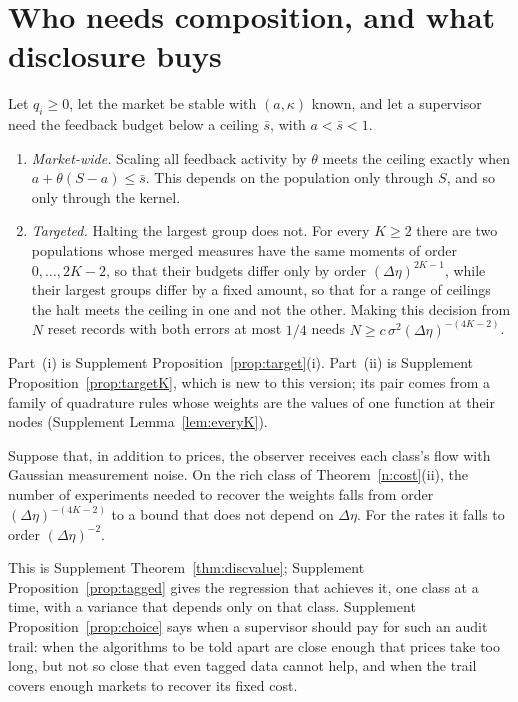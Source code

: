 \section{Who needs composition, and what disclosure buys}\label{n:sup}

\begin{proposition}\label{n:target}
Let $q_i\ge0$, let the market be stable with $(a,\kappa)$ known, and let a supervisor need the feedback budget below a ceiling $\bar s$, with $a<\bar s<1$.
\begin{enumerate}[label=(\roman*),itemsep=1pt]
\item \emph{Market-wide.} Scaling all feedback activity by $\theta$ meets the ceiling exactly when $a+\theta(S-a)\le\bar s$. This depends on the population only through $S$, and so only through the kernel.
\item \emph{Targeted.} Halting the largest group does not. For every $K\ge2$ there are two populations whose merged measures have the same moments of order $0,\ldots,2K-2$, so that their budgets differ only by order $(\Delta\eta)^{2K-1}$, while their largest groups differ by a fixed amount, so that for a range of ceilings the halt meets the ceiling in one and not the other. Making this decision from $N$ reset records with both errors at most $1/4$ needs $N\ge c\,\sigma^2(\Delta\eta)^{-(4K-2)}$.
\end{enumerate}
\end{proposition}

Part~(i) is Supplement Proposition~\ref{prop:target}(i). Part~(ii) is Supplement Proposition~\ref{prop:targetK}, which is new to this version; its pair comes from a family of quadrature rules whose weights are the values of one function at their nodes (Supplement Lemma~\ref{lem:everyK}).

\begin{theorem}\label{n:disc}
Suppose that, in addition to prices, the observer receives each class's flow with Gaussian measurement noise. On the rich class of Theorem~\ref{n:cost}(ii), the number of experiments needed to recover the weights falls from order $(\Delta\eta)^{-(4K-2)}$ to a bound that does not depend on $\Delta\eta$. For the rates it falls to order $(\Delta\eta)^{-2}$.
\end{theorem}

This is Supplement Theorem~\ref{thm:discvalue}; Supplement Proposition~\ref{prop:tagged} gives the regression that achieves it, one class at a time, with a variance that depends only on that class. Supplement Proposition~\ref{prop:choice} says when a supervisor should pay for such an audit trail: when the algorithms to be told apart are close enough that prices take too long, but not so close that even tagged data cannot help, and when the trail covers enough markets to recover its fixed cost.

